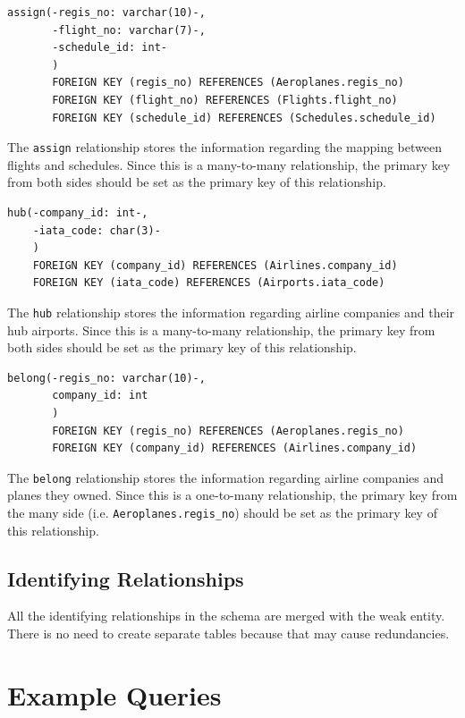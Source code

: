 \documentclass{article}
\begin{document}
	\begin{lstlisting}[keepspaces=true]		
assign(-regis_no: varchar(10)-,
       -flight_no: varchar(7)-,
       -schedule_id: int-
       )
       FOREIGN KEY (regis_no) REFERENCES (Aeroplanes.regis_no)
       FOREIGN KEY (flight_no) REFERENCES (Flights.flight_no)
       FOREIGN KEY (schedule_id) REFERENCES (Schedules.schedule_id)
	\end{lstlisting}    
	The \texttt{assign} relationship stores the information regarding the mapping between flights and schedules. Since this is a many-to-many relationship, the primary key from both sides should be set as the primary key of this relationship.

	\begin{lstlisting}[keepspaces=true]	
hub(-company_id: int-,
    -iata_code: char(3)-
    )
    FOREIGN KEY (company_id) REFERENCES (Airlines.company_id)
    FOREIGN KEY (iata_code) REFERENCES (Airports.iata_code)
	\end{lstlisting}    
	The \texttt{hub} relationship stores the information regarding airline companies and their hub airports. Since this is a many-to-many relationship, the primary key from both sides should be set as the primary key of this relationship.

	\begin{lstlisting}[keepspaces=true]	
belong(-regis_no: varchar(10)-,
       company_id: int
       )
       FOREIGN KEY (regis_no) REFERENCES (Aeroplanes.regis_no)
       FOREIGN KEY (company_id) REFERENCES (Airlines.company_id)
	\end{lstlisting}
    The \texttt{belong} relationship stores the information regarding airline companies and planes they owned. Since this is a one-to-many relationship, the primary key from the many side (i.e. \texttt{Aeroplanes.regis\_no}) should be set as the primary key of this relationship.
	
	\subsection{Identifying Relationships}
	
	All the identifying relationships in the schema are merged with the weak entity. There is no need to create separate tables because that may cause redundancies.
	
	\section{Example Queries}
	
\end{document}
